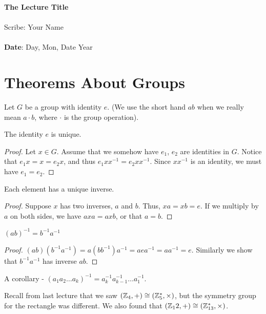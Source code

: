 \documentclass[11pt,twosided]{article}
\def\titlestring{The Lecture Title}
\def\scribestring{Your Name}
\def\datestring{Day, Mon, Date Year}
\begin{document}
\thispagestyle{plain}  %

\noindent
{\LARGE \textbf{\titlestring}}\\\\
%
{\Large Scribe: \scribestring}\\ \\
{\textbf{Date}: \datestring}


\noindent

\section{Theorems About Groups}
 
Let $G$ be a group with identity $e$. (We use the short hand $ab$ when we really mean $a \cdot b$, where $\cdot$ is the group operation). 

\begin{theorem}
The identity $e$ is unique.
\end{theorem}
\begin{proof}
Let $x \in G$. Assume that we somehow have $e_1$, $e_2$ are identities in $G$. Notice that $e_1 x = x = e_2 x$, and thus $e_1 x x^{-1} = e_2 x x^{-1}$. Since $x x^{-1}$ is an identity, we must have $e_1 = e_2$. 
\end{proof}

\begin{theorem}
Each element has a unique inverse. 
\end{theorem}
\begin{proof}
Suppose $x$ has two inverses, $a$ and $b$. Thus, $xa = xb = e$. If we multiply by $a$ on both sides, we have $axa = axb$, or that $a = b$. 
\end{proof}

\begin{theorem}
$(ab)^{-1} = b^{-1}a^{-1}$
\end{theorem}
\begin{proof}
$(ab)(b^{-1}a^{-1}) = a(b b^{-1}) a^{-1} = aea^{-1} = aa^{-1} = e$. Similarly we show that $b^{-1}a^{-1}$ has inverse $ab$. 
\end{proof}

A corollary - $(a_1 a_2 \ldots a_k)^{-1} = a_k^{-1} a_{k-1}^{-1} \ldots a_1^{-1}$. 

Recall from last lecture that we saw $(\mathbb Z_4, +) \cong (\mathbb Z_5^*, \times)$, but the symmetry group for the rectangle was different. We also found that $(\mathbb Z_12, +) \cong (\mathbb Z_{13}^*, \times)$. 
\end{document}
